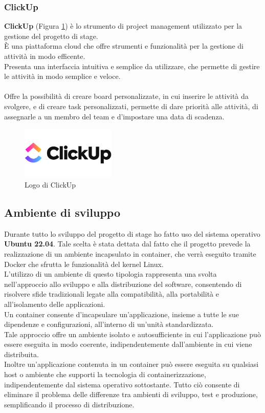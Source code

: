 \subsubsection{ClickUp}   %
\textbf{ClickUp} (Figura \ref{fig:clickup}) è lo strumento di \gls{project management}{} utilizzato per la gestione del progetto di stage.\\ 
È una piattaforma cloud che offre strumenti e funzionalità per la gestione di attività in modo efficente.\\
Presenta una interfaccia intuitiva e semplice da utilizzare, che permette di gestire le attività in modo semplice e veloce.\\
\pagebreak
\\
Offre la possibilità di creare \gls{board}{} personalizzate, in cui inserire le attività da svolgere, e di creare \gls{task}{} personalizzati,
permette di dare priorità alle attività, di assegnarle a un membro del team e d'impostare una data di scadenza.\\

\begin{figure}[h]
    \centering
    \includegraphics[width=0.4\textwidth]{images/tecnologie/logo_clickup.png}
    \caption{Logo di ClickUp}
    \label{fig:clickup}
\end{figure}
\subsection{Ambiente di sviluppo}
Durante tutto lo sviluppo del progetto di stage ho fatto uso del sistema operativo \textbf{Ubuntu 22.04}. Tale scelta è stata 
dettata dal fatto che il progetto prevede la realizzazione di un ambiente incapsulato in \gls{container}{}, che verrà eseguito tramite \gls{Docker}{} che 
sfrutta le funzionalità del kernel Linux.\\
L'utilizzo di un ambiente di questo tipologia rappresenta una svolta nell'approccio allo sviluppo e alla distribuzione del software, consentendo di risolvere sfide tradizionali legate alla compatibilità, alla portabilità e all'isolamento delle applicazioni.\\
Un \gls{container}{} consente d'incapsulare un'applicazione, insieme a tutte le sue dipendenze e configurazioni, all'interno di un'unità standardizzata.
\\Tale approccio offre un ambiente isolato e autosufficiente in cui l'applicazione può essere eseguita in modo coerente, indipendentemente dall'ambiente in cui viene distribuita.
\\Inoltre un'applicazione contenuta in un \gls{container}{} può essere eseguita su qualsiasi host o ambiente che supporti la tecnologia di containerizzazione, indipendentemente dal sistema operativo sottostante. 
Tutto ciò consente di eliminare il problema delle differenze tra ambienti di sviluppo, test e produzione, semplificando il processo di distribuzione.
